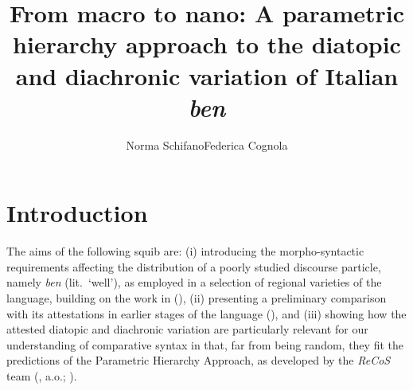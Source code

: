 \documentclass[output=paper]{langsci/langscibook}
\author{Norma Schifano\affiliation{University of Birmingham}\lastand Federica
Cognola\affiliation{La Sapienza University, Rome}}
\title{From macro to nano: A parametric hierarchy approach to the diatopic and
diachronic variation of Italian \textit{ben}}
\begin{document}
\glsresetall


\section{Introduction}

The aims of the following squib are: (i) introducing the morpho-syntactic
requirements affecting the distribution of a poorly studied discourse particle,
namely  \emph{ben} (lit.\ ‘well’), as employed in a selection of
regional varieties of the language, building on the work in
\textcite{CognSchi2015,CognSchi2018b,CognSchi2018} (),
(ii) presenting a preliminary comparison with its attestations in earlier
stages of the language (), and (iii) showing how the
attested diatopic and diachronic variation are particularly relevant for our
understanding of comparative syntax in that, far from being random, they fit
the predictions of the Parametric Hierarchy Approach, as developed by the
\emph{ReCoS} team
(\citealt{Roberts2012,BibRob2012,BibRob2015,BibRob2016,BibHolRobShee2014,BibRobShee2014},
a.o.; ).
\end{document}
